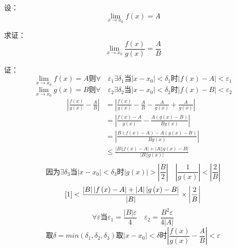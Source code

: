 \documentclass{article}
\begin{document}
设：
\[
  \lim_{x \rightarrow x_{0}}{f\left( x \right)}=A
\]

求证：
\[
  \lim_{x \rightarrow x_0}{\frac{f\left( x \right)}{g\left( x \right)}}=\frac{A}{B}
\]

证：
\[
  \lim_{x \rightarrow x_0}{f\left( x \right)}=A \text{则} \forall \quad \varepsilon_1 \exists \delta_1 \text{当} \left| x - x_0 \right|<\delta_1 \text{时} \left| f\left( x \right)-A \right|<\varepsilon_1
\]
\[
  \lim_{x \rightarrow x_0}{g\left( x \right)}=B \text{则} \forall \quad \varepsilon_2 \exists \delta_2 \text{当} \left| x - x_0 \right|<\delta_2 \text{时} \left| f\left( x \right)-B \right|<\varepsilon_2
\]
\begin{align*}
  \left| \frac{f\left( x \right)}{g\left( x \right)}-\frac{A}{B} \right| &= \left| \frac{f\left( x \right)}{g\left( x \right)}-\frac{A}{B}-\frac{A}{g\left( x \right)}+\frac{A}{g\left(x\right)} \right| \\
  & =\left| \frac{f\left( x \right)-A}{g\left( x \right)}-\frac{A\left( g\left( x \right)-B \right)}{Bg\left( x \right)} \right| \\
  & =\left| \frac{B\left( f\left( x \right)-A \right)-A\left( g\left( x \right)-B \right)}{Bg\left( x \right)} \right| \\
  & \leq\frac{\left| B \right|\left| f\left( x \right)-A \right|+\left| A \right|\left| g\left(x\right)-B \right|}{\left|B\right|\left|g\left(x\right)\right|} \tag*{(1)}\label{1} \\
\end{align*}
\[
  \text{因为} \exists \delta_3 \text{当} \left|x-x_0\right|<\delta_3 \text{时} \left| g\left(x\right)\right|>\left|\frac{B}{2}\right| \quad \left|\frac{1}{g\left(x\right)}\right|<\left|\frac{2}{B}\right|
\]
\[
  \ref{1} < \frac{\left|B\right|\left|f\left(x\right)-A\right|+\left|A\right|\left|g\left(x\right)-B\right|}{\left|B\right|}\times\left|\frac{2}{B}\right|
\]
\[
  \forall \varepsilon \text{当} \varepsilon_1=\frac{\left|B\right|\varepsilon}{4} \quad \varepsilon_2=\frac{B^{2}\varepsilon}{4\left|A\right|}
\]
\[
  \text{取} \delta=min\left(\delta_1,\delta_2,\delta_3\right) \text{取} \left|x-x_0\right|<\delta \text{时} \left|\frac{f\left(x\right)}{g\left(x\right)}-\frac{A}{B}\right|<\varepsilon
\]
\end{document}

